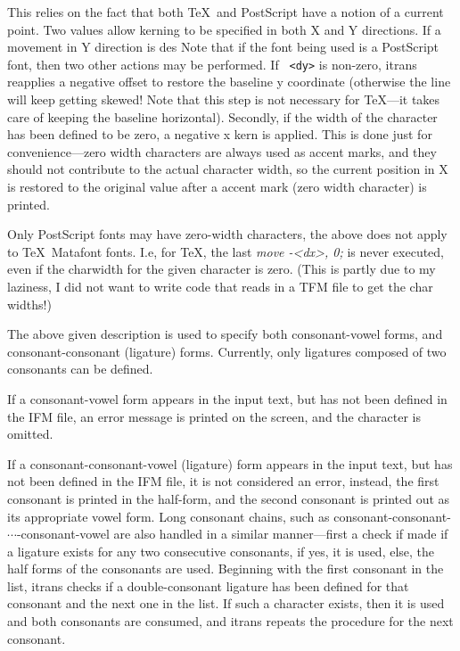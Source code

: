 \documentclass[11pt]{article}
\begin{document}
This relies on the fact that both \TeX\ and PostScript have a notion of a
current point.
Two values allow kerning to be specified in  both X and Y  directions.
If a movement in Y direction is des
Note that if the font being used is a PostScript font, then two other
actions may be performed.
If \verb+ <dy>+ is non-zero, itrans reapplies a negative offset to
restore the baseline y coordinate (otherwise the line will keep getting
skewed! Note that this step is not necessary for \TeX---it takes care 
of keeping the baseline horizontal).
Secondly, if the width of the character has been defined to be zero, a
negative x kern is applied.
This is done just for convenience---zero width characters are always
used as accent marks, and they should not contribute to the actual
character width, so the current position in X is restored to the original
value after a accent mark (zero width character) is printed.

Only PostScript fonts may have zero-width characters, the above does not
apply to \TeX\ Matafont fonts.
I.e, for \TeX, the last {\em move -<dx>, 0;} is never executed, even if
the charwidth for the given character is zero.
(This is partly due to my laziness, I did not want to write code that
reads in a TFM file to get the char widths!)

The above given description is used to specify both consonant-vowel
forms, and consonant-consonant (ligature) forms.
Currently, only ligatures composed of two consonants can be defined.

If a consonant-vowel form appears in the input text, but has not been
defined in the IFM file, an error message is printed on the screen, and
the character is omitted.

If a consonant-consonant-vowel (ligature) form appears in the input text,
but has not been
defined in the IFM file, it is not considered an error, instead, the
first consonant is printed in the half-form, and the second consonant
is printed out as its appropriate vowel form.
Long consonant chains, such as consonant-consonant-$\cdots$-consonant-vowel 
are also handled in a similar manner---first a check if made if a ligature
exists for any two consecutive consonants, if yes, it is used, else, the
half forms of the consonants are used.
Beginning with the first consonant in the list,
itrans checks if a double-consonant ligature has
been defined for  that consonant and  the next one in the list.
If such a character exists, then it is used and both consonants are consumed,
and itrans repeats the procedure for the next consonant.
\end{document}
